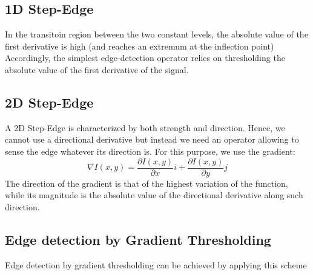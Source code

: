 \documentclass{article}
\begin{document}
\subsection{1D Step-Edge} %
In the transitoin region between the two constant levels, the absolute value of the first derivative is high (and reaches an extremum at the inflection point)
Accordingly, the simplest edge-detection operator relies on thresholding the absolute value of the first derivative of the signal. 
\subsection{2D Step-Edge} %
A 2D Step-Edge is characterized by both strength and direction. Hence, we cannot use a directional derivative but instead we need an operator allowing to sense the edge whatever its direction is. For this purpose, we use the gradient:
\[
    \nabla I(x,y)=\displaystyle\frac{\partial I (x,y)}{\partial x}i + \displaystyle\frac{\partial I (x,y)}{\partial y} j
\]
The direction of the gradient is that of the highest variation of the function, while its magnitude is the absolute value of the directional derivative along such direction. 

\subsection{Edge detection by Gradient Thresholding}
Edge detection by gradient thresholding can be achieved by applying this scheme 
\end{document}
